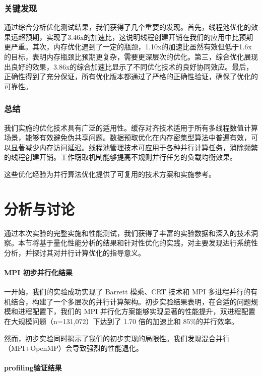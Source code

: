 \documentclass[a4paper]{article}
\begin{document}
\subsubsection{关键发现}

通过综合分析优化测试结果，我们获得了几个重要的发现。首先，线程池优化的效果远超预期，实现了3.46x的加速比，这说明线程创建开销在我们的应用中比预期更严重。其次，内存优化遇到了一定的瓶颈，1.10x的加速比虽然有效但低于1.6x的目标，表明内存瓶颈比预期更复杂，需要更深层次的优化。第三，综合优化展现出良好的效果，3.86x的综合加速比显示了不同优化技术的良好协同效应。最后，正确性得到了充分保证，所有优化版本都通过了严格的正确性验证，确保了优化的可靠性。

\subsubsection{总结}

我们实施的优化技术具有广泛的适用性。缓存对齐技术适用于所有多线程数值计算场景，能够有效避免伪共享问题。数据预取优化在内存密集型算法中普遍有效，可以显著减少内存访问延迟。线程池管理技术可应用于各种并行计算任务，消除频繁的线程创建开销。工作窃取机制能够提高不规则并行任务的负载均衡效果。

这些优化经验为并行算法优化提供了可复用的技术方案和实施参考。

\section{分析与讨论}

通过本次实验的完整实施和性能测试，我们获得了丰富的实验数据和深入的技术洞察。本节将基于量化性能分析的结果和针对性优化的实践，对主要发现进行系统性分析，并探讨其对并行计算优化的指导意义。

\paragraph{MPI 初步并行化结果}

一开始，我们的实验成功实现了 Barrett 模乘、CRT 技术和 MPI 多进程并行的有机结合，构建了一个多层次的并行计算架构。初步实验结果表明，在合适的问题规模和进程配置下，我们的 MPI 并行化方案能够实现显著的性能提升，双进程配置在大规模问题（n=131,072）下达到了 1.70 倍的加速比和 85\%的并行效率。

然而，初步实验同时揭示了我们的初步实现的局限性。我们发现混合并行（MPI+OpenMP）会导致强烈的性能退化。

\paragraph{profiling验证结果}
\end{document}
